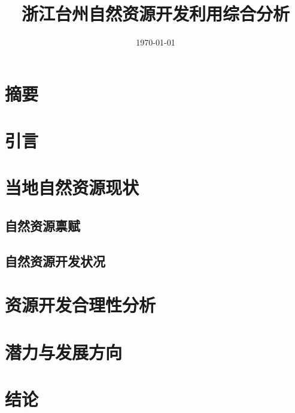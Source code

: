 \documentclass[11pt]{article}
\title{浙江台州自然资源开发利用综合分析}
\author{\Author}
\date{\today}
\begin{document}
\maketitle

\section{摘要}\label{sec:abstract}

\section{引言}\label{sec:introduction}

\section{当地自然资源现状}\label{sec:current-situation}

\subsection{自然资源禀赋}\label{subsec:resource-current-situation}

\subsection{自然资源开发状况}\label{subsec:resoure-develop}

\section{资源开发合理性分析}\label{sec:analysis}

\section{潜力与发展方向}\label{sec:future}

\section{结论}\label{sec:conclusion}
\end{document}
